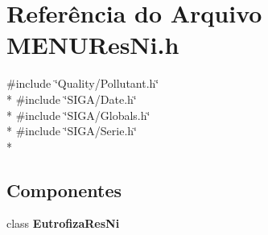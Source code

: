 \section{Referência do Arquivo M\+E\+N\+U\+Res\+Ni.\+h}
\label{_m_e_n_u_res_ni_8h}
{\ttfamily \#include \char`\"{}Quality/\+Pollutant.\+h\char`\"{}}\\*
{\ttfamily \#include \char`\"{}S\+I\+G\+A/\+Date.\+h\char`\"{}}\\*
{\ttfamily \#include \char`\"{}S\+I\+G\+A/\+Globals.\+h\char`\"{}}\\*
{\ttfamily \#include \char`\"{}S\+I\+G\+A/\+Serie.\+h\char`\"{}}\\*
\subsection*{Componentes}
\begin{DoxyCompactItemize}
\item 
class {\bf Eutrofiza\+Res\+Ni}
\end{DoxyCompactItemize}
